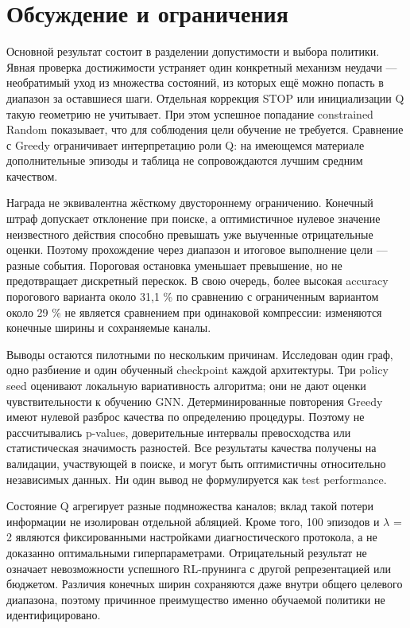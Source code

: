 \documentclass[10pt,a4paper]{article}
\begin{document}
\section*{Обсуждение и ограничения}
Основной результат состоит в разделении допустимости и выбора политики. Явная проверка достижимости устраняет один конкретный механизм неудачи — необратимый уход из множества состояний, из которых ещё можно попасть в диапазон за оставшиеся шаги. Отдельная коррекция STOP или инициализации Q такую геометрию не учитывает. При этом успешное попадание constrained Random показывает, что для соблюдения цели обучение не требуется. Сравнение с Greedy ограничивает интерпретацию роли Q: на имеющемся материале дополнительные эпизоды и таблица не сопровождаются лучшим средним качеством.

Награда не эквивалентна жёсткому двустороннему ограничению. Конечный штраф допускает отклонение при поиске, а оптимистичное нулевое значение неизвестного действия способно превышать уже выученные отрицательные оценки. Поэтому прохождение через диапазон и итоговое выполнение цели — разные события. Пороговая остановка уменьшает превышение, но не предотвращает дискретный перескок. В свою очередь, более высокая accuracy порогового варианта около 31,1 \% по сравнению с ограниченным вариантом около 29 \% не является сравнением при одинаковой компрессии: изменяются конечные ширины и сохраняемые каналы.

Выводы остаются пилотными по нескольким причинам. Исследован один граф, одно разбиение и один обученный checkpoint каждой архитектуры. Три policy seed оценивают локальную вариативность алгоритма; они не дают оценки чувствительности к обучению GNN. Детерминированные повторения Greedy имеют нулевой разброс качества по определению процедуры. Поэтому не рассчитывались p-values, доверительные интервалы превосходства или статистическая значимость разностей. Все результаты качества получены на валидации, участвующей в поиске, и могут быть оптимистичны относительно независимых данных. Ни один вывод не формулируется как test performance.

Состояние Q агрегирует разные подмножества каналов; вклад такой потери информации не изолирован отдельной абляцией. Кроме того, 100 эпизодов и $\lambda$ = 2 являются фиксированными настройками диагностического протокола, а не доказанно оптимальными гиперпараметрами. Отрицательный результат не означает невозможности успешного RL-прунинга с другой репрезентацией или бюджетом. Различия конечных ширин сохраняются даже внутри общего целевого диапазона, поэтому причинное преимущество именно обучаемой политики не идентифицировано.
\end{document}
